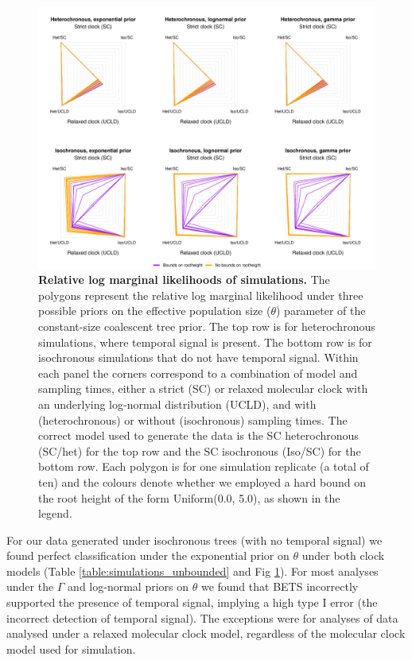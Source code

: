 \documentclass[10pt,letterpaper]{article}
\begin{document}
\begin{figure}[!h]
	\begin{center}
		\includegraphics[width=14cm]{sandbox_figures/coalescent_constant_sims.pdf}\newline
		\vspace{-0.3cm}
		\caption{{\textbf{Relative log marginal likelihoods of simulations.} The polygons represent the relative log marginal likelihood under three possible priors on the effective population size ($\theta$) parameter of the constant-size coalescent tree prior. The top row is for heterochronous simulations, where temporal signal is present. The bottom row is for isochronous simulations that do not have temporal signal. Within each panel the corners correspond to a combination of model and sampling times, either a strict (SC) or relaxed molecular clock with an underlying log-normal distribution (UCLD), and with (heterochronous) or without (isochronous) sampling times. The correct model used to generate the data is the SC heterochronous (SC/het) for the top row and the SC isochronous (Iso/SC) for the bottom row. Each polygon is for one simulation replicate (a total of ten) and the colours denote whether we employed a hard bound on the root height of the form Uniform(0.0, 5.0), as shown in the legend.}}
		\label{figure:SC_polygons}
	\end{center}
\end{figure}

For our data generated under isochronous trees (with no temporal signal) we found perfect classification under the exponential prior on $\theta$ under both clock models (Table \ref{table:simulations_unbounded} and Fig \ref{figure:SC_polygons}). For most analyses under the $\Gamma$ and log-normal priors on $\theta$ we found that BETS incorrectly supported the presence of temporal signal, implying a high type I error (the incorrect detection of temporal signal). The exceptions were for analyses of data analysed under a relaxed molecular clock model, regardless of the molecular clock model used for simulation. 
\end{document}
